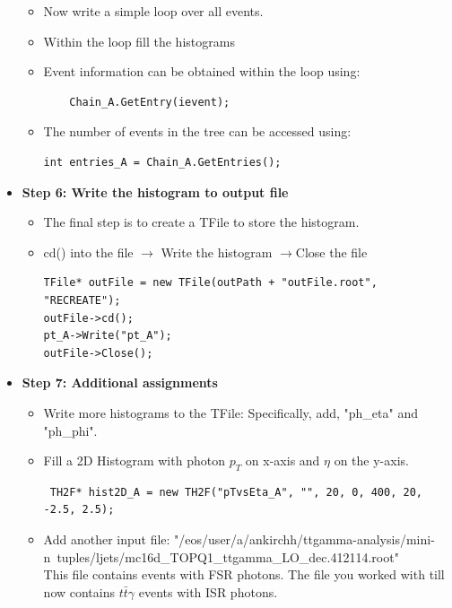 \documentclass[letterpaper,12pt]{article}
\begin{document}
\begin{itemize}
\begin{itemize}
\item Now write a simple loop over all events.
\item Within the loop fill the histograms
\item Event information can be obtained within the loop using:
\begin{lstlisting}
	Chain_A.GetEntry(ievent);
\end{lstlisting}
\item The number of events in the tree can be accessed using:

\begin{lstlisting}
int entries_A = Chain_A.GetEntries();
\end{lstlisting}
\end{itemize}
\item {\bf Step 6: Write the histogram to output file}
\begin{itemize}
	\item The final step is to create a TFile to store the histogram. 
\item cd() into the file $\rightarrow$ Write the histogram $\rightarrow$Close the file

\begin{lstlisting}     
TFile* outFile = new TFile(outPath + "outFile.root", "RECREATE");
outFile->cd();             
pt_A->Write("pt_A");
outFile->Close();                                                    
         \end{lstlisting}
\end{itemize}

\item{\bf Step 7: Additional assignments}
\begin{itemize}
	\item Write more histograms to the TFile: Specifically, add, "ph\_eta" and "ph\_phi".  
	\item Fill a 2D Histogram with photon $p_{T}$ on x-axis and $\eta$ on the y-axis.
	\begin{lstlisting}
 TH2F* hist2D_A = new TH2F("pTvsEta_A", "", 20, 0, 400, 20, -2.5, 2.5);
\end{lstlisting}

\item Add another input file: "/eos/user/a/ankirchh/ttgamma-analysis/mini-n\
tuples/ljets/mc16d\_TOPQ1\_ttgamma\_LO\_dec.412114.root" \\
This file contains events with FSR photons. The file you worked with till now contains $t\bar{t}\gamma$ events with ISR photons.\\ 



\end{itemize}
\end{itemize}
\end{document}
